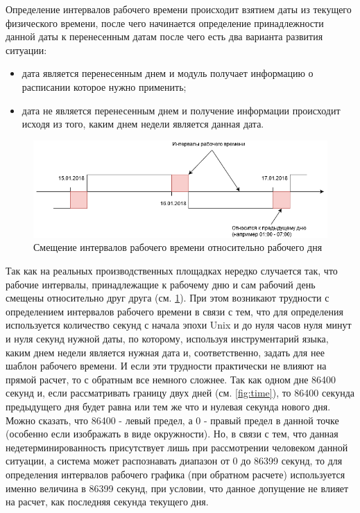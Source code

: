 \indent Определение интервалов рабочего времени происходит взятием даты из текущего физического времени, после чего начинается определение принадлежности данной даты к перенесенным датам после чего есть два варианта развития ситуации:

\begin{itemize}
	\item дата является перенесенным днем и модуль получает информацию о расписании которое нужно применить;
	\item дата не является перенесенным днем и получение информации происходит исходя из того, каким днем недели является данная дата.
\end{itemize}

\begin{figure}[h]
	\includegraphics[width=\linewidth]{pics/scheduleIntervals.png}
	\caption{Смещение интервалов рабочего времени относительно рабочего дня}
	\label{fig:intervals}
	\centering
\end{figure}

\indent Так как на реальных производственных площадках нередко случается так, что рабочие интервалы, принадлежащие к рабочему дню и сам рабочий день смещены относительно друг друга (см. \ref{fig:intervals}).
При этом возникают трудности с определением интервалов рабочего времени в связи с тем, что для определения используется количество секунд с начала эпохи Unix и до нуля часов нуля минут и нуля секунд нужной даты, по которому, используя инструментарий языка, каким днем недели является нужная дата и, соответственно, задать для нее шаблон рабочего времени.
И если эти трудности практически не влияют на прямой расчет, то с обратным все немного сложнее.
Так как одном дне 86400 секунд и, если рассматривать границу двух дней (см. \ref{fig:time}), то 86400 секунда предыдущего дня будет равна или тем же что и нулевая секунда нового дня.
Можно сказать, что 86400 - левый предел, а 0 - правый предел в данной точке (особенно если изображать в виде окружности).
Но, в связи с тем, что данная недетерминированность присутствует лишь при рассмотрении человеком данной ситуации, а система может распознавать диапазон от 0 до 86399 секунд, то для определения интервалов рабочего графика (при обратном расчете) используется именно величина в 86399 секунд, при условии, что данное допущение не влияет на расчет, как последняя секунда текущего дня.

